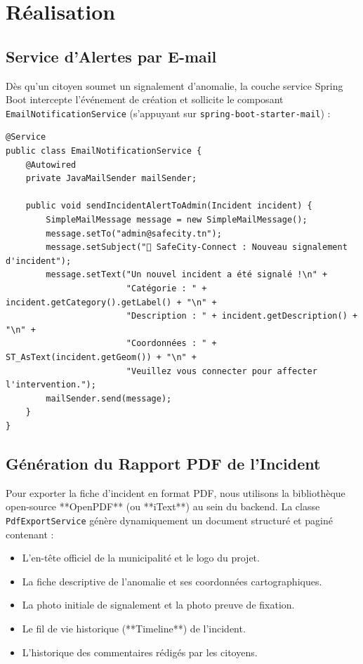 \section{Réalisation}

\subsection{Service d'Alertes par E-mail}
Dès qu'un citoyen soumet un signalement d'anomalie, la couche service Spring Boot intercepte l'événement de création et sollicite le composant \texttt{EmailNotificationService} (s'appuyant sur \texttt{spring-boot-starter-mail}) :
\begin{verbatim}
@Service
public class EmailNotificationService {
    @Autowired
    private JavaMailSender mailSender;

    public void sendIncidentAlertToAdmin(Incident incident) {
        SimpleMailMessage message = new SimpleMailMessage();
        message.setTo("admin@safecity.tn");
        message.setSubject("🚨 SafeCity-Connect : Nouveau signalement d'incident");
        message.setText("Un nouvel incident a été signalé !\n" +
                        "Catégorie : " + incident.getCategory().getLabel() + "\n" +
                        "Description : " + incident.getDescription() + "\n" +
                        "Coordonnées : " + ST_AsText(incident.getGeom()) + "\n" +
                        "Veuillez vous connecter pour affecter l'intervention.");
        mailSender.send(message);
    }
}
\end{verbatim}

\subsection{Génération du Rapport PDF de l'Incident}
Pour exporter la fiche d'incident en format PDF, nous utilisons la bibliothèque open-source **OpenPDF** (ou **iText**) au sein du backend. La classe \texttt{PdfExportService} génère dynamiquement un document structuré et paginé contenant :
\begin{itemize}
    \item L'en-tête officiel de la municipalité et le logo du projet.
    \item La fiche descriptive de l'anomalie et ses coordonnées cartographiques.
    \item La photo initiale de signalement et la photo preuve de fixation.
    \item Le fil de vie historique (**Timeline**) de l'incident.
    \item L'historique des commentaires rédigés par les citoyens.
\end{itemize}

